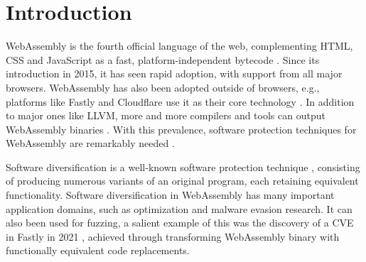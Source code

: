 \documentclass[a4paper,fleqn]{cas-dc}
\newcommand{\Wasm}{WebAssembly\xspace}
\newcommand{\wasm}{\Wasm}
\begin{document}



\maketitle


\section{Introduction}


\Wasm is the fourth official language of the web, complementing HTML, CSS and JavaScript as a fast, platform-independent bytecode  \cite{haas2017bringing, WebAssemblyCoreSpecification}. 
Since its introduction in 2015, it has seen rapid adoption, with support from all major browsers. 
\wasm has also been adopted outside of browsers, e.g., platforms like Fastly and Cloudflare use it as their core technology \cite{fastly}.
In addition to major ones like LLVM, more and more compilers and tools can output \wasm binaries \cite{hilbig2021empirical, javy, kmm}. 
With this prevalence, software protection techniques for \wasm are remarkably needed \cite{avengers}.

Software diversification is a well-known software protection technique \cite{cohen1993operating, 4197960, 595185}, consisting of producing numerous variants of an original program, each retaining equivalent functionality. 
Software diversification in \wasm has many important application domains, such as optimization \cite{superwasm} and malware evasion \cite{CABRERAARTEAGA2023103296} research. 
It can also been used for fuzzing, a salient example of this was the discovery of a CVE in Fastly in 2021 \cite{CVE}, achieved through transforming \wasm binary with functionally equivalent code replacements.
\end{document}
